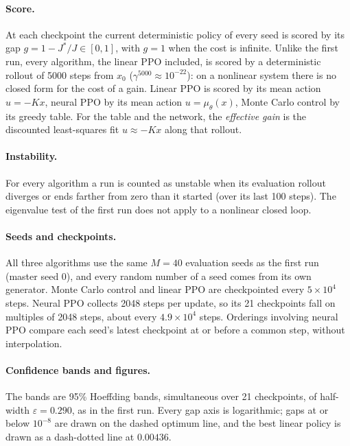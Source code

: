 \documentclass[11pt]{article}
\begin{document}
\paragraph{Score.} At each checkpoint the current deterministic policy of every seed is scored by its
gap $g = 1 - J^*/J \in [0, 1]$, with $g = 1$ when the cost is infinite. Unlike the first run, every
algorithm, the linear PPO included, is scored by a deterministic rollout of 5000 steps from $x_0$
($\gamma^{5000} \approx 10^{-22}$): on a nonlinear system there is no closed form for the cost of a
gain. Linear PPO is scored by its mean action $u = -Kx$, neural PPO by its mean action
$u = \mu_\theta(x)$, Monte Carlo control by its greedy table. For the table and the network, the
\emph{effective gain} is the discounted least-squares fit $u \approx -Kx$ along that rollout.

\paragraph{Instability.} For every algorithm a run is counted as unstable when its evaluation rollout
diverges or ends farther from zero than it started (over its last 100 steps). The eigenvalue test of
the first run does not apply to a nonlinear closed loop.

\paragraph{Seeds and checkpoints.} All three algorithms use the same $M = 40$ evaluation seeds as the
first run (master seed 0), and every random number of a seed comes from its own generator. Monte
Carlo control and linear PPO are checkpointed every $5 \times 10^4$ steps. Neural PPO collects
2048 steps per update, so its 21 checkpoints fall on multiples of 2048 steps, about every
$4.9 \times 10^4$ steps. Orderings involving neural PPO compare each seed's latest checkpoint at or
before a common step, without interpolation.

\paragraph{Confidence bands and figures.} The bands are 95\% Hoeffding bands, simultaneous over 21
checkpoints, of half-width $\varepsilon = 0.290$, as in the first run. Every gap axis is logarithmic;
gaps at or below $10^{-8}$ are drawn on the dashed optimum line, and the best linear policy is drawn
as a dash-dotted line at $0.00436$.
\end{document}
